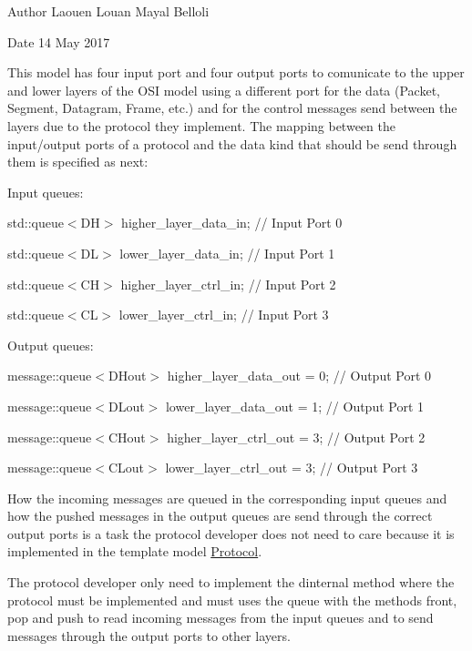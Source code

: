 \begin{DoxyAuthor}{Author}
Laouen Louan Mayal Belloli 
\end{DoxyAuthor}
\begin{DoxyDate}{Date}
14 May 2017
\end{DoxyDate}
This model has four input port and four output ports to comunicate to the upper and lower layers of the O\+SI model using a different port for the data (Packet, Segment, Datagram, Frame, etc.) and for the control messages send between the layers due to the protocol they implement. The mapping between the input/output ports of a protocol and the data kind that should be send through them is specified as next\+:

Input queues\+:
\begin{DoxyItemize}
\item std\+::queue$<$\+D\+H$>$ higher\+\_\+layer\+\_\+data\+\_\+in; // Input Port 0
\item std\+::queue$<$\+D\+L$>$ lower\+\_\+layer\+\_\+data\+\_\+in; // Input Port 1
\item std\+::queue$<$\+C\+H$>$ higher\+\_\+layer\+\_\+ctrl\+\_\+in; // Input Port 2
\item std\+::queue$<$\+C\+L$>$ lower\+\_\+layer\+\_\+ctrl\+\_\+in; // Input Port 3
\end{DoxyItemize}

Output queues\+:
\begin{DoxyItemize}
\item message\+::queue$<$\+D\+Hout$>$ higher\+\_\+layer\+\_\+data\+\_\+out = 0; // Output Port 0
\item message\+::queue$<$\+D\+Lout$>$ lower\+\_\+layer\+\_\+data\+\_\+out = 1; // Output Port 1
\item message\+::queue$<$\+C\+Hout$>$ higher\+\_\+layer\+\_\+ctrl\+\_\+out = 3; // Output Port 2
\item message\+::queue$<$\+C\+Lout$>$ lower\+\_\+layer\+\_\+ctrl\+\_\+out = 3; // Output Port 3
\end{DoxyItemize}

How the incoming messages are queued in the corresponding input queues and how the pushed messages in the output queues are send through the correct output ports is a task the protocol developer does not need to care because it is implemented in the template model \hyperlink{classProtocol}{Protocol}.

The protocol developer only need to implement the dinternal method where the protocol must be implemented and must uses the queue with the methods front, pop and push to read incoming messages from the input queues and to send messages through the output ports to other layers.


